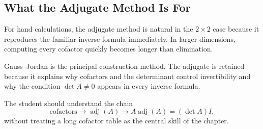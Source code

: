 \subsection{What the Adjugate Method Is For}

For hand calculations, the adjugate method is natural in the $2\times2$ case because it reproduces the familiar inverse formula immediately. In larger dimensions, computing every cofactor quickly becomes longer than elimination.

\begin{interpretationbox}
Gauss--Jordan is the principal construction method. The adjugate is retained because it explains why cofactors and the determinant control invertibility and why the condition $\det A\neq0$ appears in every inverse formula.
\end{interpretationbox}

The student should understand the chain
\[
\text{cofactors}\longrightarrow\operatorname{adj}(A)
\longrightarrow A\operatorname{adj}(A)=(\det A)I,
\]
without treating a long cofactor table as the central skill of the chapter.
